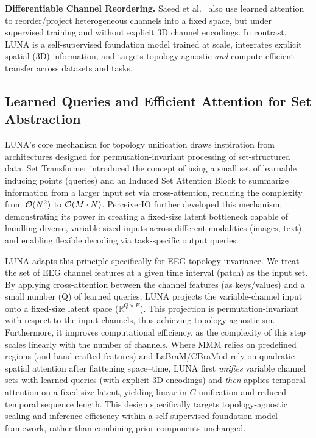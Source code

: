 \textbf{Differentiable Channel Reordering.}
Saeed et al.~\citep{saeed2021learning} also use learned attention to reorder/project heterogeneous channels into a fixed space, but under supervised training and without explicit 3D channel encodings. In contrast, LUNA is a self-supervised foundation model trained at scale, integrates explicit spatial (3D) information, and targets topology-agnostic \emph{and} compute-efficient transfer across datasets and tasks.
\subsection{Learned Queries and Efficient Attention for Set Abstraction}
LUNA's core mechanism for topology unification draws inspiration from architectures designed for permutation-invariant processing of set-structured data. Set Transformer \citep{lee2019set} introduced the concept of using a small set of learnable inducing points (queries) and an Induced Set Attention Block to summarize information from a larger input set via cross-attention, reducing the complexity from $\mathcal{O}(N^2)$ to $\mathcal{O}(M \cdot N)$. PerceiverIO \citep{jaegle2021perceiver} further developed this mechanism, demonstrating its power in creating a fixed-size latent bottleneck capable of handling diverse, variable-sized inputs across different modalities (images, text) and enabling flexible decoding via task-specific output queries.

LUNA adapts this principle specifically for EEG topology invariance. We treat the set of EEG channel features at a given time interval (patch) as the input set. By applying cross-attention between the channel features (as keys/values) and a small number (Q) of learned queries, LUNA projects the variable-channel input onto a fixed-size latent space ($\mathbb{R}^{Q \times E}$). This projection is permutation-invariant with respect to the input channels, thus achieving topology agnosticism. Furthermore, it improves computational efficiency, as the complexity of this step scales linearly with the number of channels. Where MMM relies on predefined regions (and hand-crafted features) and LaBraM/CBraMod rely on quadratic spatial attention after flattening space–time, LUNA first \emph{unifies} variable channel sets with learned queries (with explicit 3D encodings) and \emph{then} applies temporal attention on a fixed-size latent, yielding linear-in-$C$ unification and reduced temporal sequence length. This design specifically targets topology-agnostic scaling and inference efficiency within a self-supervised foundation-model framework, rather than combining prior components unchanged.



